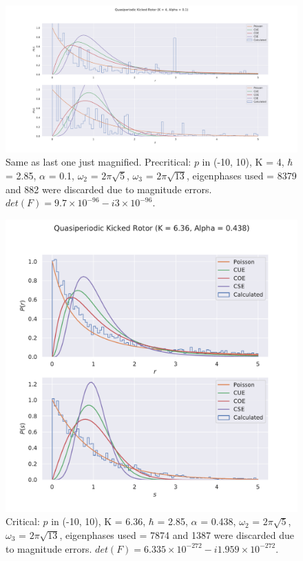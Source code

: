\documentclass[12pt]{article}
\begin{document}
\begin{figure}[h]
    \includegraphics[width=\linewidth]{quasiperiodic_kickedrotor_spectrum_N10_precritical_magnified.pdf}
    \caption{Same as last one just magnified.
    Precritical: $p$ in (-10, 10), K = 4, $\hbar$ = 2.85, $\alpha$ = 0.1,
    $\omega_2$ = $2\pi\sqrt{5}$, $\omega_3$ = $2\pi\sqrt{13}$, eigenphases
    used = 8379 and 882 were discarded due to magnitude errors. $det(F) = 9.7
    \times 10^{-96} - i 3 \times 10^{-96}$.}
    \centering
\end{figure}

\begin{figure}[h]
    \includegraphics[width=\linewidth]{quasiperiodic_kickedrotor_spectrum_N10_critical.pdf}
    \caption{Critical: $p$ in (-10, 10), K = 6.36, $\hbar$ = 2.85, $\alpha$ = 0.438,
    $\omega_2$ = $2\pi\sqrt{5}$, $\omega_3$ = $2\pi\sqrt{13}$, eigenphases
    used = 7874 and 1387 were discarded due to magnitude errors. $det(F) =
    6.335 \times 10^{-272} - i 1.959 \times 10^{-272}$.}
    \centering
\end{figure}
\end{document}
